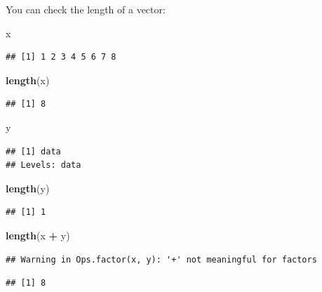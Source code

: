 \documentclass[]{book}
\newenvironment{Shaded}{\begin{snugshade}}{\end{snugshade}}
\newcommand{\KeywordTok}[1]{\textcolor[rgb]{0.13,0.29,0.53}{\textbf{#1}}}
\newcommand{\NormalTok}[1]{#1}
\newcommand{\OperatorTok}[1]{\textcolor[rgb]{0.81,0.36,0.00}{\textbf{#1}}}
\newcommand{\StringTok}[1]{\textcolor[rgb]{0.31,0.60,0.02}{#1}}
\theoremstyle{definition}
\theoremstyle{definition}
\theoremstyle{definition}
\theoremstyle{remark}
\begin{document}
You can check the length of a vector:

\begin{Shaded}
\begin{Highlighting}[]
\NormalTok{x}
\end{Highlighting}
\end{Shaded}

\begin{verbatim}
## [1] 1 2 3 4 5 6 7 8
\end{verbatim}

\begin{Shaded}
\begin{Highlighting}[]
\KeywordTok{length}\NormalTok{(x)}
\end{Highlighting}
\end{Shaded}

\begin{verbatim}
## [1] 8
\end{verbatim}

\begin{Shaded}
\begin{Highlighting}[]
\NormalTok{y}
\end{Highlighting}
\end{Shaded}

\begin{verbatim}
## [1] data
## Levels: data
\end{verbatim}

\begin{Shaded}
\begin{Highlighting}[]
\KeywordTok{length}\NormalTok{(y)}
\end{Highlighting}
\end{Shaded}

\begin{verbatim}
## [1] 1
\end{verbatim}

\begin{Shaded}
\begin{Highlighting}[]
\KeywordTok{length}\NormalTok{(x }\OperatorTok{+}\StringTok{ }\NormalTok{y)}
\end{Highlighting}
\end{Shaded}

\begin{verbatim}
## Warning in Ops.factor(x, y): '+' not meaningful for factors
\end{verbatim}

\begin{verbatim}
## [1] 8
\end{verbatim}
\end{document}
